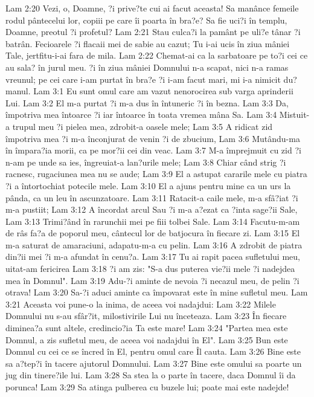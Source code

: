 Lam 2:20  Vezi, o, Doamne, ?i prive?te cui ai facut aceasta! Sa manânce femeile rodul pântecelui lor, copiii pe care îi poarta în bra?e? Sa fie uci?i în templu, Doamne, preotul ?i profetul?
Lam 2:21  Stau culca?i la pamânt pe uli?e tânar ?i batrân. Fecioarele ?i flacaii mei de sabie au cazut; Tu i-ai ucis în ziua mâniei Tale, jertfitu-i-ai fara de mila.
Lam 2:22  Chemat-ai ca la sarbatoare pe to?i cei ce au sala? în jurul meu. ?i în ziua mâniei Domnului n-a scapat, nici n-a ramas vreunul; pe cei care i-am purtat în bra?e ?i i-am facut mari, mi i-a nimicit du?manul.
Lam 3:1  Eu sunt omul care am vazut nenorocirea sub varga aprinderii Lui.
Lam 3:2  El m-a purtat ?i m-a dus în întuneric ?i în bezna.
Lam 3:3  Da, împotriva mea întoarce ?i iar întoarce în toata vremea mâna Sa.
Lam 3:4  Mistuit-a trupul meu ?i pielea mea, zdrobit-a oasele mele;
Lam 3:5  A ridicat zid împotriva mea ?i m-a înconjurat de venin ?i de zbucium,
Lam 3:6  Mutându-ma în împara?ia morii, ca pe mor?ii cei din veac.
Lam 3:7  M-a împrejmuit cu zid ?i n-am pe unde sa ies, îngreuiat-a lan?urile mele;
Lam 3:8  Chiar când strig ?i racnesc, rugaciunea mea nu se aude;
Lam 3:9  El a astupat cararile mele cu piatra ?i a întortochiat potecile mele.
Lam 3:10  El a ajuns pentru mine ca un urs la pânda, ca un leu în ascunzatoare.
Lam 3:11  Ratacit-a caile mele, m-a sfâ?iat ?i m-a pustiit;
Lam 3:12  A încordat arcul Sau ?i m-a a?ezat ca ?inta sage?ii Sale,
Lam 3:13  Trimi?ând în rarunchii mei pe fiii tolbei Sale.
Lam 3:14  Facutu-m-am de râs fa?a de poporul meu, cântecul lor de batjocura în fiecare zi.
Lam 3:15  El m-a saturat de amaraciuni, adapatu-m-a cu pelin.
Lam 3:16  A zdrobit de piatra din?ii mei ?i m-a afundat în cenu?a.
Lam 3:17  Tu ai rapit pacea sufletului meu, uitat-am fericirea
Lam 3:18  ?i am zis: "S-a dus puterea vie?ii mele ?i nadejdea mea în Domnul".
Lam 3:19  Adu-?i aminte de nevoia ?i necazul meu, de pelin ?i otrava!
Lam 3:20  Sa-?i aduci aminte ca împovarat este în mine sufletul meu.
Lam 3:21  Aceasta voi pune-o la inima, de aceea voi nadajdui:
Lam 3:22  Milele Domnului nu s-au sfâr?it, milostivirile Lui nu înceteaza.
Lam 3:23  În fiecare diminea?a sunt altele, credincio?ia Ta este mare!
Lam 3:24  "Partea mea este Domnul, a zis sufletul meu, de aceea voi nadajdui în El".
Lam 3:25  Bun este Domnul cu cei ce se încred în El, pentru omul care Îl cauta.
Lam 3:26  Bine este sa a?tep?i în tacere ajutorul Domnului.
Lam 3:27  Bine este omului sa poarte un jug din tinere?ile lui.
Lam 3:28  Sa stea la o parte în tacere, daca Domnul îi da porunca!
Lam 3:29  Sa atinga pulberea cu buzele lui; poate mai este nadejde!
